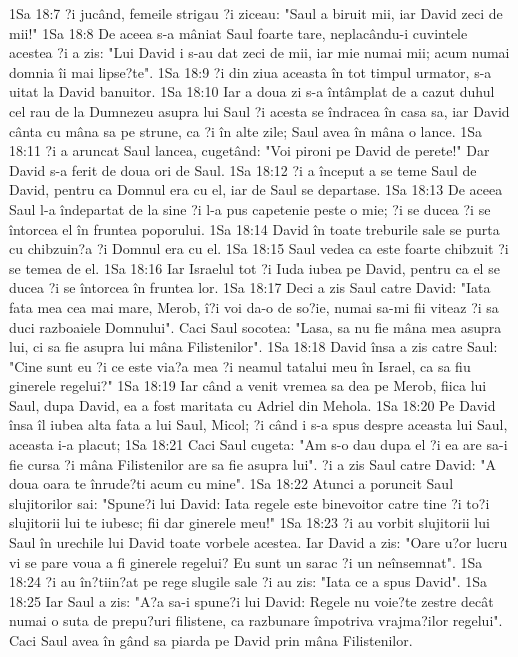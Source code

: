 1Sa 18:7  ?i jucând, femeile strigau ?i ziceau: "Saul a biruit mii, iar David zeci de mii!"
1Sa 18:8  De aceea s-a mâniat Saul foarte tare, neplacându-i cuvintele acestea ?i a zis: "Lui David i s-au dat zeci de mii, iar mie numai mii; acum numai domnia îi mai lipse?te".
1Sa 18:9  ?i din ziua aceasta în tot timpul urmator, s-a uitat la David banuitor.
1Sa 18:10  Iar a doua zi s-a întâmplat de a cazut duhul cel rau de la Dumnezeu asupra lui Saul ?i acesta se îndracea în casa sa, iar David cânta cu mâna sa pe strune, ca ?i în alte zile; Saul avea în mâna o lance.
1Sa 18:11  ?i a aruncat Saul lancea, cugetând: "Voi pironi pe David de perete!" Dar David s-a ferit de doua ori de Saul.
1Sa 18:12  ?i a început a se teme Saul de David, pentru ca Domnul era cu el, iar de Saul se departase.
1Sa 18:13  De aceea Saul l-a îndepartat de la sine ?i l-a pus capetenie peste o mie; ?i se ducea ?i se întorcea el în fruntea poporului.
1Sa 18:14  David în toate treburile sale se purta cu chibzuin?a ?i Domnul era cu el.
1Sa 18:15  Saul vedea ca este foarte chibzuit ?i se temea de el.
1Sa 18:16  Iar Israelul tot ?i Iuda iubea pe David, pentru ca el se ducea ?i se întorcea în fruntea lor.
1Sa 18:17  Deci a zis Saul catre David: "Iata fata mea cea mai mare, Merob, î?i voi da-o de so?ie, numai sa-mi fii viteaz ?i sa duci razboaiele Domnului". Caci Saul socotea: "Lasa, sa nu fie mâna mea asupra lui, ci sa fie asupra lui mâna Filistenilor".
1Sa 18:18  David însa a zis catre Saul: "Cine sunt eu ?i ce este via?a mea ?i neamul tatalui meu în Israel, ca sa fiu ginerele regelui?"
1Sa 18:19  Iar când a venit vremea sa dea pe Merob, fiica lui Saul, dupa David, ea a fost maritata cu Adriel din Mehola.
1Sa 18:20  Pe David însa îl iubea alta fata a lui Saul, Micol; ?i când i s-a spus despre aceasta lui Saul, aceasta i-a placut;
1Sa 18:21  Caci Saul cugeta: "Am s-o dau dupa el ?i ea are sa-i fie cursa ?i mâna Filistenilor are sa fie asupra lui". ?i a zis Saul catre David: "A doua oara te înrude?ti acum cu mine".
1Sa 18:22  Atunci a poruncit Saul slujitorilor sai: "Spune?i lui David: Iata regele este binevoitor catre tine ?i to?i slujitorii lui te iubesc; fii dar ginerele meu!"
1Sa 18:23  ?i au vorbit slujitorii lui Saul în urechile lui David toate vorbele acestea. Iar David a zis: "Oare u?or lucru vi se pare voua a fi ginerele regelui? Eu sunt un sarac ?i un neînsemnat".
1Sa 18:24  ?i au în?tiin?at pe rege slugile sale ?i au zis: "Iata ce a spus David".
1Sa 18:25  Iar Saul a zis: "A?a sa-i spune?i lui David: Regele nu voie?te zestre decât numai o suta de prepu?uri filistene, ca razbunare împotriva vrajma?ilor regelui". Caci Saul avea în gând sa piarda pe David prin mâna Filistenilor.
